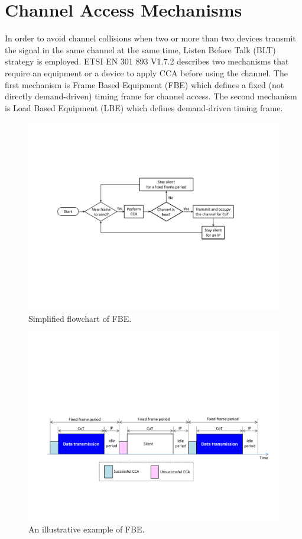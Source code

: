 \section{Channel Access Mechanisms}
\label{subsec:ETSI-overview}

In order to avoid channel collisions when two or more than two devices transmit the signal in the same channel at the same time, Listen Before Talk (BLT) strategy is employed. ETSI EN 301 893 V1.7.2 \cite{LBT-ETSI-2014} describes two mechanisms that require an equipment or a device to apply CCA before using the channel. The first mechanism is Frame Based Equipment (FBE) which defines a fixed (not directly demand-driven) timing frame for channel access. The second mechanism is Load Based Equipment (LBE) which defines demand-driven timing frame.

\begin{figure}[!t]
	\centering
	\includegraphics[width=0.9\columnwidth]{figures2/FBE-flowchart}
	\caption{Simplified flowchart of FBE.}
	\label{figs:FBE-flowchart}
\end{figure}

\begin{figure}[!t]
	\centering
	\includegraphics[width=0.9\columnwidth]{figures2/FBE-example}
	\caption{An illustrative example of FBE.}
	\label{figs:FBE-example}
\end{figure}


